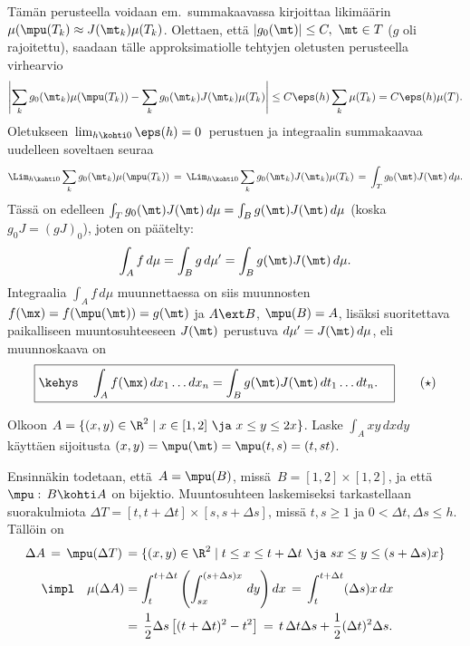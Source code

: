 Tämän perusteella voidaan em.\ summakaavassa kirjoittaa likimäärin
$\mu(\mpu(T_k) \approx J(\mt_k)\mu(T_k)$. Olettaen, että $|g_0(\mt)| \le C,\ \mt \in T$
($g$ oli rajoitettu), saadaan tälle approksimatiolle tehtyjen oletusten perusteella virhearvio
\[
\left|\sum_k g_0(\mt_k)\mu(\mpu(T_k))-\sum_k g_0(\mt_k)J(\mt_k)\mu(T_k)\right|
\le C\eps(h)\sum_k\mu(T_k) = C\eps(h)\mu(T).
\]
Oletukseen $\,\lim_{h \kohti 0}\eps(h)=0\,$ perustuen ja integraalin summakaavaa uudelleen
soveltaen seuraa
\[
\Lim_{h \kohti 0} \sum_k g_0(\mt_k)\mu(\mpu(T_k)) 
          \,=\, \Lim_{h \kohti 0} \sum_k g_0(\mt_k)J(\mt_k)\mu(T_k)
          \,=\, \int_T g_0(\mt)J(\mt)\,d\mu.
\]
Tässä on edelleen $\int_T g_0(\mt)J(\mt)\,d\mu = \int_B g(\mt)J(\mt)\,d\mu$
(koska $g_0J=(gJ)_0$), joten on päätelty:
\[
\int_A f\,d\mu = \int_B g\,d\mu' = \int_B g(\mt)J(\mt)\,d\mu.
\]
Integraalia $\int_A f\,d\mu$ muunnettaessa on siis muunnosten $f(\mx)=f(\mpu(\mt))=g(\mt)$
ja $A \ext B$, $\mpu(B)=A$, lisäksi suoritettava paikalliseen muuntosuhteeseen $J(\mt)$
perustuva  $d\mu'=J(\mt)\,d\mu$, eli muunnoskaava on
\begin{equation} \label{muuntokaava}
\boxed{\kehys\quad \int_A f(\mx)\,dx_1\ldots dx_n=\int_B g(\mt)J(\mt)\,dt_1\ldots dt_n. \quad}
\tag{$\star$}
\end{equation}
\begin{Exa} Olkoon $A=\{(x,y)\in\R^2 \mid x\in[1,2]\ \ja\ x \le y \le 2x\}$. Laske
$\int_A xy\,dxdy\,$ käyttäen sijoitusta $(x,y)=\mpu(\mt)=\mpu(t,s)=(t,st)$.
\end{Exa}
\ratk Ensinnäkin todetaan, että $\,A=\mpu(B)$, missä $\,B=[1,2]\times[1,2]$, ja että 
$\mpu:\,B \kohti A$ on bijektio. Muuntosuhteen laskemiseksi tarkastellaan suorakulmiota 
$\Delta T=[t,t+\Delta t]\times[s,s+\Delta s]$, missä $t,s \ge 1$ ja 
$0 < \Delta t,\Delta s \le h$. Tällöin on
\begin{align*}
\Delta A\,=\,\mpu(\Delta T)\,
         &=\{(x,y)\in\R^2 \mid t \le x \le t+\Delta t\ \ja\ sx \le y \le (s+\Delta s)x\}\\[1mm]
\impl\quad\mu(\Delta A) 
         &= \int_t^{t+\Delta t}\left(\int_{sx}^{(s+\Delta s)x}\,dy\right)dx\,
          =\,\int_t^{t+\Delta t} (\Delta s)x\,dx \\
         &=\,\frac{1}{2}\Delta s\left[(t+\Delta t)^2-t^2\right]\,
          =\,t\,\Delta t\Delta s + \frac{1}{2}(\Delta t)^2\Delta s.
\end{align*}
